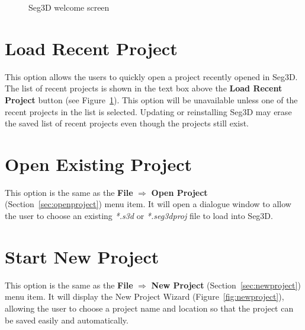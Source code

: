 \documentclass[fleqn,11pt,openany]{book}
\begin{document}
\begin{figure}
\caption{Seg3D welcome screen}\label{fig:welcome}
\end{figure}


\section{Load Recent Project}

This option allows the users to quickly open a project recently opened in Seg3D.
The list of recent projects is shown in the text box above the \textbf{Load Recent Project} button (see Figure~\ref{fig:welcome}).
This option will be unavailable unless one of the recent projects in the list is selected.
Updating or reinstalling Seg3D may erase the saved list of recent projects even though the projects still exist.  

\section{Open Existing Project}

This option is the same as the \textbf{File} $\Rightarrow$ \textbf{Open Project} (Section~\ref{sec:openproject}) menu item.
It will open a dialogue window to allow the user to choose an existing \textit{*.s3d} or \textit{*.seg3dproj} file to load into Seg3D.  

\section{Start New Project}

This option is the same as the \textbf{File} $\Rightarrow$ \textbf{New Project} (Section~\ref{sec:newproject}) menu item.
It will display the New Project Wizard (Figure~\ref{fig:newproject}), allowing the user to choose a project name and location so that the project can be saved easily and automatically.  
\end{document}
